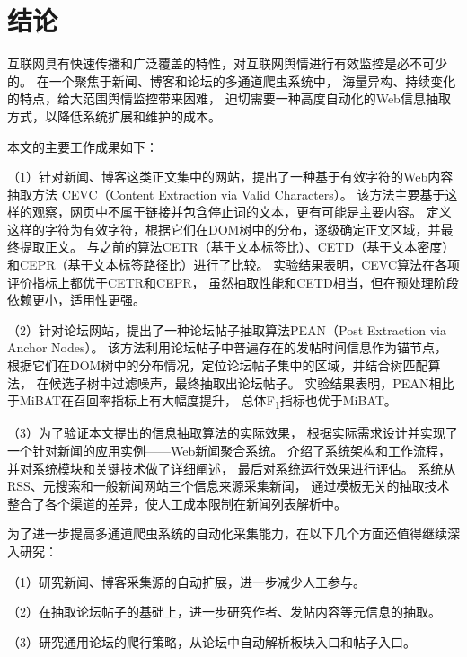 
\chapter*{结\quad 论}
{}

互联网具有快速传播和广泛覆盖的特性，对互联网舆情进行有效监控是必不可少的。
在一个聚焦于新闻、博客和论坛的多通道爬虫系统中，
海量异构、持续变化的特点，给大范围舆情监控带来困难，
迫切需要一种高度自动化的Web信息抽取方式，以降低系统扩展和维护的成本。

本文的主要工作成果如下：

（1）针对新闻、博客这类正文集中的网站，提出了一种基于有效字符的Web内容抽取方法
CEVC（Content Extraction via Valid Characters）。
该方法主要基于这样的观察，网页中不属于链接并包含停止词的文本，更有可能是主要内容。
定义这样的字符为有效字符，根据它们在DOM树中的分布，逐级确定正文区域，并最终提取正文。
与之前的算法CETR（基于文本标签比）、CETD（基于文本密度）
和CEPR（基于文本标签路径比）进行了比较。
实验结果表明，CEVC算法在各项评价指标上都优于CETR和CEPR，
虽然抽取性能和CETD相当，但在预处理阶段依赖更小，适用性更强。

（2）针对论坛网站，提出了一种论坛帖子抽取算法PEAN（Post Extraction via Anchor Nodes）。
该方法利用论坛帖子中普遍存在的发帖时间信息作为锚节点，
根据它们在DOM树中的分布情况，定位论坛帖子集中的区域，并结合树匹配算法，
在候选子树中过滤噪声，最终抽取出论坛帖子。
实验结果表明，PEAN相比于MiBAT在召回率指标上有大幅度提升，
总体F\textsubscript{1}指标也优于MiBAT。

（3）为了验证本文提出的信息抽取算法的实际效果，
根据实际需求设计并实现了一个针对新闻的应用实例——Web新闻聚合系统。
介绍了系统架构和工作流程，并对系统模块和关键技术做了详细阐述，
最后对系统运行效果进行评估。
系统从RSS、元搜索和一般新闻网站三个信息来源采集新闻，
通过模板无关的抽取技术整合了各个渠道的差异，使人工成本限制在新闻列表解析中。

为了进一步提高多通道爬虫系统的自动化采集能力，在以下几个方面还值得继续深入研究：

（1）研究新闻、博客采集源的自动扩展，进一步减少人工参与。

（2）在抽取论坛帖子的基础上，进一步研究作者、发帖内容等元信息的抽取。

（3）研究通用论坛的爬行策略，从论坛中自动解析板块入口和帖子入口。
